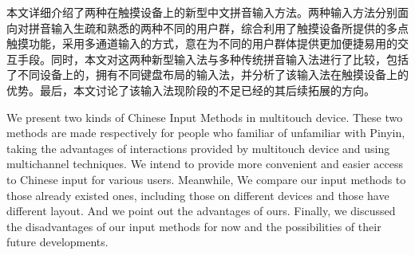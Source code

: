 

\cleardoublepage
\begin{cabstract}

  本文详细介绍了两种在触摸设备上的新型中文拼音输入方法。两种输入方法分别面向对拼音输入生疏和熟悉的两种不同的用户群，综合利用了触摸设备所提供的多点触摸功能，采用多通道输入的方式，意在为不同的用户群体提供更加便捷易用的交互手段。同时，本文对这两种新型输入法与多种传统拼音输入法进行了比较，包括了不同设备上的，拥有不同键盘布局的输入法，并分析了该输入法在触摸设备上的优势。最后，本文讨论了该输入法现阶段的不足已经的其后续拓展的方向。

\end{cabstract}

\cleardoublepage
\begin{eabstract}

  We present two kinds of Chinese Input Methods in multitouch device. These two methods are made respectively for people who familiar of unfamiliar with Pinyin, taking the advantages of interactions provided by multitouch device and using multichannel techniques. We intend to provide more convenient and easier access to Chinese input for various users. Meanwhile, We compare our input methods to those already existed ones, including those on different devices and those have different layout. And we point out the advantages of ours. Finally, we discussed the disadvantages of our input methods for now and the possibilities of their future developments.

\end{eabstract}
